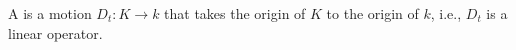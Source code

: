 A  is a motion $D_t: K \rightarrow k$ that takes the origin of $K$ to the origin of $k$, i.e., $D_t$ is a linear operator.